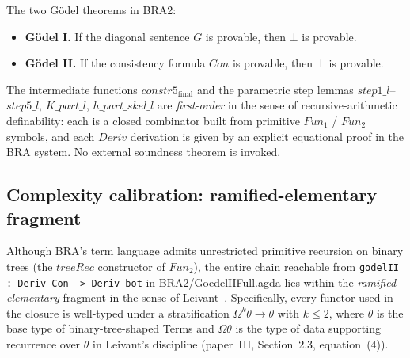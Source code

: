 \documentclass[11pt]{article}
\begin{document}
The two G\"odel theorems in BRA2:
\begin{itemize}
  \item \textbf{G\"odel I.} If the diagonal sentence $G$ is provable, then $\bot$ is provable.
  \item \textbf{G\"odel II.} If the consistency formula $\mathit{Con}$ is provable, then $\bot$ is provable.
\end{itemize}

The intermediate functions $\mathit{constr5}_{\mathrm{final}}$ and the
parametric step lemmas $\mathit{step1\_l}$--$\mathit{step5\_l}$,
$K\_\mathit{part}\_l$, $h\_\mathit{part}\_\mathit{skel}\_l$ are
\emph{first-order} in the sense of recursive-arithmetic definability:
each is a closed combinator built from primitive $\mathit{Fun}_1$ /
$\mathit{Fun}_2$ symbols, and each $\mathit{Deriv}$ derivation is given
by an explicit equational proof in the BRA system.  No external
soundness theorem is invoked.

\subsection{Complexity calibration: ramified-elementary fragment}
\label{subsec:elementary}

Although BRA's term language admits unrestricted primitive recursion on
binary trees (the $\mathit{treeRec}$ constructor of $\mathit{Fun}_2$),
the entire chain reachable from
\verb|godelII : Deriv Con -> Deriv bot| in BRA2/GoedelIIFull.agda lies
within the \emph{ramified-elementary} fragment in the sense of
Leivant~\cite{leivant1999ramified}.  Specifically, every functor used
in the closure is well-typed under a stratification
$\Omega^k\theta \to \theta$ with $k \le 2$, where $\theta$ is the base
type of binary-tree-shaped Terms and $\Omega\theta$ is the type of
data supporting recurrence over $\theta$ in Leivant's discipline
(paper~III, Section~2.3, equation~(4)).
\end{document}
